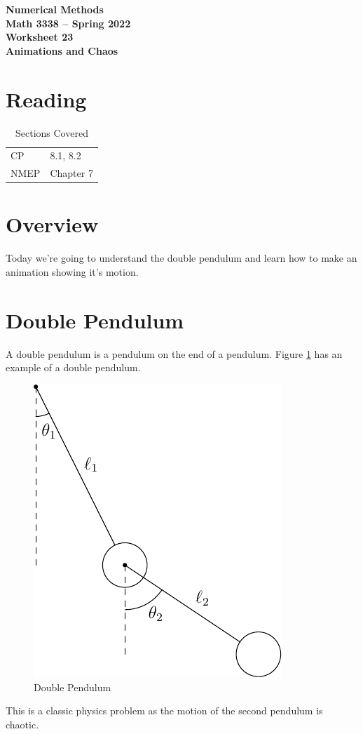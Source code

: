 \documentclass[11pt,letterpaper]{article}
\newcommand{\semester}{Spring 2022}
\begin{document}
\begin{center}
{\huge{\bf  Numerical Methods}} \\[1.5ex]
{\bf Math 3338 -- \semester}\\[1.5ex]
{\Large{\bf Worksheet 23\ \\[2ex] Animations and Chaos}}\\
\end{center}
\vspace{2mm}


\section{Reading}

\begin{table}[!ht]
 \centering
 \begin{tabular}{ll}
   CP &  8.1, 8.2 \\
 NMEP &  Chapter 7
 \end{tabular}
\caption{Sections Covered}
\end{table}

\section{Overview}
Today we're going to understand the double pendulum and learn how to make an animation 
showing it's motion.

\section{Double Pendulum}
A double pendulum is a pendulum on the end of a pendulum. Figure \ref{fig:pendulum} has an example
of a double pendulum.
\begin{figure}[!ht]
 \centering
 \includegraphics{images/pendulum.pdf}
 \caption{Double Pendulum}
 \label{fig:pendulum}
\end{figure}
This is a classic physics problem as the motion of the second pendulum is chaotic. 
\end{document}
